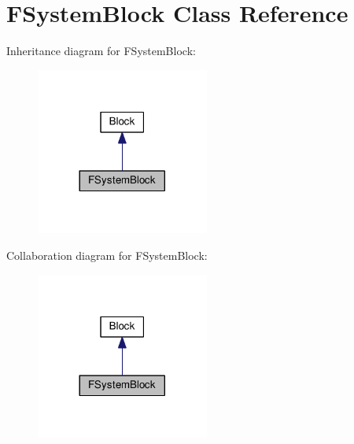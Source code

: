 \hypertarget{classFSystemBlock}{}\section{F\+System\+Block Class Reference}
\label{classFSystemBlock}


Inheritance diagram for F\+System\+Block\+:
\nopagebreak
\begin{figure}[H]
\begin{center}
\leavevmode
\includegraphics[width=161pt]{classFSystemBlock__inherit__graph}
\end{center}
\end{figure}


Collaboration diagram for F\+System\+Block\+:
\nopagebreak
\begin{figure}[H]
\begin{center}
\leavevmode
\includegraphics[width=161pt]{classFSystemBlock__coll__graph}
\end{center}
\end{figure}

